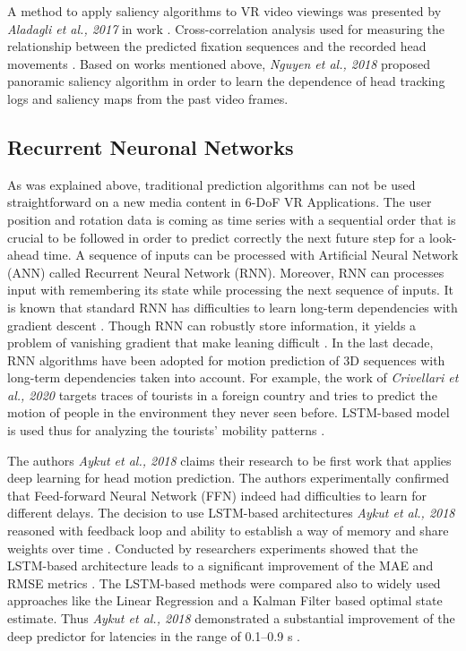 A method to apply saliency algorithms to VR video viewings was presented by \textit{Aladagli et al., 2017} in work \cite{predicting_360}. Cross-correlation analysis used for measuring the relationship between the predicted fixation sequences and the recorded head movements \cite{predicting_360}. Based on works mentioned above, \textit{Nguyen et al., 2018} proposed panoramic saliency algorithm in order to learn the dependence of head tracking logs and saliency maps from the past video frames.\\

\subsection{Recurrent Neuronal Networks}
\label{sec:related:deep}
As was explained above, traditional prediction algorithms can not be used straightforward on a new media content in 6-DoF VR Applications. The user position and rotation data is coming as time series with a sequential order that is crucial to be followed in order to predict correctly the next future step for a look-ahead time. A sequence of inputs can be processed with Artificial Neural Network (ANN) called Recurrent Neural Network (RNN). Moreover, RNN can processes input with remembering its state while processing the next sequence of inputs. It is known that standard RNN has difficulties to learn long-term dependencies with gradient descent \cite{rnn_difficults}. Though RNN can robustly store information, it yields a problem of vanishing gradient that make leaning difficult \cite{rnn_difficults}. In the last decade, RNN algorithms have been adopted for motion prediction of 3D sequences with long-term dependencies taken into account. For example, the work of \textit{Crivellari et al., 2020} targets traces of tourists in a foreign country and tries to predict the motion of people in the environment they never seen before. LSTM-based model is used thus for analyzing the tourists’ mobility patterns \cite{tourist_traces}.

The authors \textit{Aykut et al., 2018} claims their research to be first work that applies deep learning for head motion prediction. The authors experimentally confirmed that Feed-forward Neural Network (FFN) indeed had difficulties to learn for different delays. The decision to use LSTM-based architectures \textit{Aykut et al., 2018} reasoned with feedback loop and ability to establish a way of memory and share weights over time \cite{delay_compensation_360}. Conducted by researchers experiments showed that the LSTM-based architecture leads to a significant improvement of the MAE and RMSE metrics \cite{delay_compensation_360}. The LSTM-based methods were compared also to widely used approaches like the Linear Regression and a Kalman Filter based optimal state estimate. Thus \textit{Aykut et al., 2018} demonstrated a substantial improvement of the deep predictor for latencies in the range of 0.1–0.9 s \cite{delay_compensation_360}.

